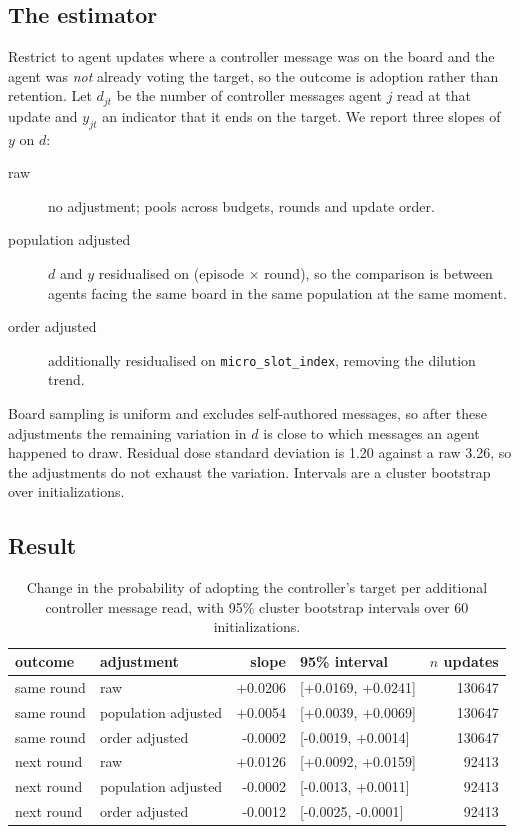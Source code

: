 \documentclass[11pt]{article}
\begin{document}
\subsection{The estimator}
Restrict to agent updates where a controller message was on the board and the agent was
\emph{not} already voting the target, so the outcome is adoption rather than retention. Let
$d_{jt}$ be the number of controller messages agent $j$ read at that update and $y_{jt}$ an
indicator that it ends on the target. We report three slopes of $y$ on $d$:

\begin{description}
\item[raw] no adjustment; pools across budgets, rounds and update order.
\item[population adjusted] $d$ and $y$ residualised on (episode $\times$ round), so the
comparison is between agents facing the same board in the same population at the same moment.
\item[order adjusted] additionally residualised on \texttt{micro\_slot\_index}, removing the
dilution trend.
\end{description}

Board sampling is uniform and excludes self-authored messages, so after these adjustments the
remaining variation in $d$ is close to which messages an agent happened to draw. Residual
dose standard deviation is 1.20 against a raw 3.26, so the adjustments do
not exhaust the variation. Intervals are a cluster bootstrap over initializations.

\subsection{Result}
\begin{table}[htbp]\centering\small
\caption{Change in the probability of adopting the controller's target per additional
controller message read, with 95\% cluster bootstrap intervals over
60 initializations.}\label{tab:dose}
\begin{tabular}{llrlr}
\toprule
outcome & adjustment & slope & 95\% interval & $n$ updates \\
\midrule
same round & raw & +0.0206 & [+0.0169, +0.0241] & 130647 \\
same round & population adjusted & +0.0054 & [+0.0039, +0.0069] & 130647 \\
same round & order adjusted & -0.0002 & [-0.0019, +0.0014] & 130647 \\
next round & raw & +0.0126 & [+0.0092, +0.0159] & 92413 \\
next round & population adjusted & -0.0002 & [-0.0013, +0.0011] & 92413 \\
next round & order adjusted & -0.0012 & [-0.0025, -0.0001] & 92413 \\
\bottomrule
\end{tabular}
\end{table}
\end{document}
